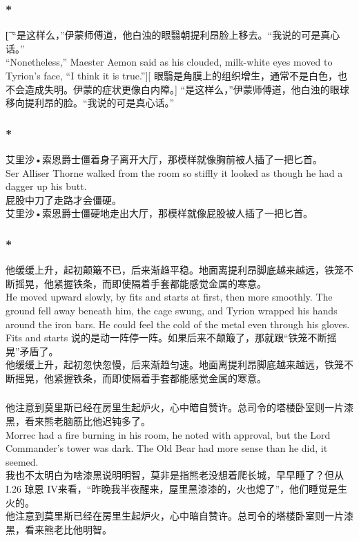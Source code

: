 \documentclass[12pt,a4paper]{article}
\newcommand{\h}[1]{{\color{red}#1}\\}
\newcommand{\la}[1]{{\color{blue}#1}\\}
\begin{document}
\subsubsection{\color{red}*}\t[	
	“是这样么，”伊蒙师傅道，他白浊的眼翳朝提利昂脸上移去。“我说的可是真心话。”\\
	“Nonetheless,” Maester Aemon said as his clouded, milk-white eyes moved to Tyrion's face, “I think it is true.”][
	眼翳是角膜上的组织增生，通常不是白色，也不会造成失明。伊蒙的症状更像白内障。]
	“是这样么，”伊蒙师傅道，他白浊的眼球移向提利昂的脸。“我说的可是真心话。”
	
\subsubsection{\color{red}*}\la{
	艾里沙•索恩爵士僵着身子离开大厅，那模样就像胸前被人插了一把匕首。\\
	Ser Alliser Thorne walked from the room so stiffly it looked as though he had a dagger up his butt.}\h{
	屁股中刀了走路才会僵硬。}
	艾里沙•索恩爵士僵硬地走出大厅，那模样就像屁股被人插了一把匕首。
\subsubsection{\color{red}*}\la{
		他缓缓上升，起初颠簸不已，后来渐趋平稳。地面离提利昂脚底越来越远，铁笼不断摇晃，他紧握铁条，而即使隔着手套都能感觉金属的寒意。\\
		He moved upward slowly, by fits and starts at first, then more smoothly. The ground fell away beneath him, the cage swung, and Tyrion wrapped his hands around the iron bars. He could feel the cold of the metal even through his gloves. }\h{
		Fits and starts 说的是动一阵停一阵。如果后来不颠簸了，那就跟“铁笼不断摇晃”矛盾了。}
		他缓缓上升，起初忽快忽慢，后来渐趋匀速。地面离提利昂脚底越来越远，铁笼不断摇晃，他紧握铁条，而即使隔着手套都能感觉金属的寒意。
		
\subsubsection{}\la{
	他注意到莫里斯已经在房里生起炉火，心中暗自赞许。总司令的塔楼卧室则一片漆黑，看来熊老脑筋比他迟钝多了。\\
	Morrec had a fire burning in his room, he noted with approval, but the Lord Commander's tower was dark. The Old Bear had more sense than he did, it seemed.} \h{
	我也不太明白为啥漆黑说明明智，莫非是指熊老没想着爬长城，早早睡了？但从I.26 琼恩 IV来看，“昨晚我半夜醒来，屋里黑漆漆的，火也熄了”，他们睡觉是生火的。}
	他注意到莫里斯已经在房里生起炉火，心中暗自赞许。总司令的塔楼卧室则一片漆黑，看来熊老比他明智。
	
\end{document}
